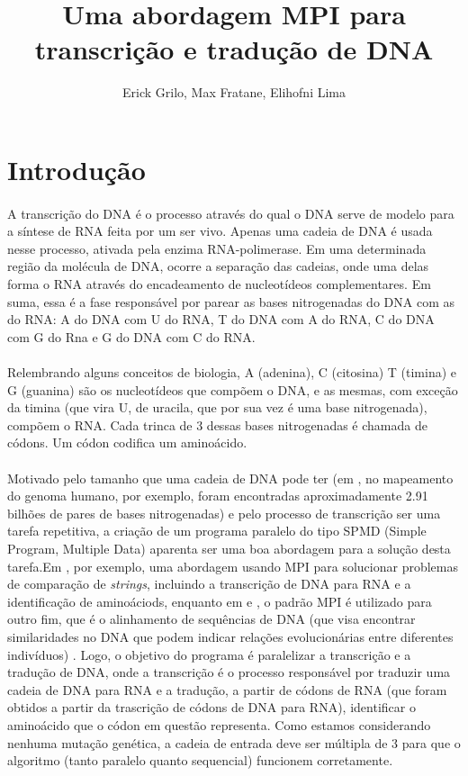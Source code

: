 \documentclass[a4paper,10pt]{article}
\title{Uma abordagem MPI para transcrição e tradução de DNA}
\author{Erick Grilo, Max Fratane, Elihofni Lima}
\begin{document}
\maketitle
\newpage

\section{Introdução}
\paragraph{}A transcrição do DNA é o processo através do qual o DNA serve de modelo para a síntese de RNA feita por um ser vivo. Apenas uma cadeia de DNA é usada nesse processo, ativada pela enzima RNA-polimerase. Em uma determinada região da molécula de DNA, ocorre a separação das cadeias, onde uma delas forma o RNA através do encadeamento de nucleotídeos complementares. Em suma, essa é a fase responsável por parear as bases nitrogenadas do DNA com as do RNA: A do DNA com U do RNA, T do DNA com A do RNA, C do DNA com G do Rna e G do DNA com C do RNA.

\paragraph{}Relembrando alguns conceitos de biologia, A (adenina), C (citosina) T (timina) e G (guanina) são os nucleotídeos que compõem o DNA, e as mesmas, com exceção da timina (que vira U, de uracila, que por sua vez é uma base nitrogenada), compõem o RNA. Cada trinca de 3 dessas bases nitrogenadas é chamada de códons. Um códon codifica um aminoácido.

\paragraph{}Motivado pelo tamanho que uma cadeia de DNA pode ter (em \citet{venter2001sequence}, no mapeamento do genoma humano, por exemplo, foram encontradas aproximadamente 2.91 bilhões de pares de bases nitrogenadas) e pelo processo de transcrição ser uma tarefa repetitiva, a criação de um programa paralelo do tipo SPMD (Simple Program, Multiple Data) aparenta ser uma boa abordagem para a solução desta tarefa.Em  \citet{chibli2008multiprocessor}, por exemplo, uma abordagem usando MPI para solucionar problemas de comparação de \emph{strings}, incluindo a transcrição de DNA para RNA e a identificação de aminoáciods, enquanto em \citet{kleinjung2002parallelized} e \citet{xue2014parallel}, o padrão MPI é utilizado para outro fim, que é o alinhamento de sequências de DNA (que visa encontrar similaridades no DNA que podem indicar relações evolucionárias entre diferentes indivíduos) . Logo, o objetivo do programa é paralelizar a transcrição e a tradução de DNA, onde a transcrição é o processo responsável por traduzir uma cadeia de DNA para RNA e a tradução, a partir de códons de RNA (que foram obtidos a partir da trascrição de códons de DNA para RNA), identificar o aminoácido que o códon em questão representa. Como estamos considerando nenhuma mutação genética, a cadeia de entrada deve ser múltipla de 3 para que o algoritmo (tanto paralelo quanto sequencial) funcionem corretamente.\\
\end{document}
